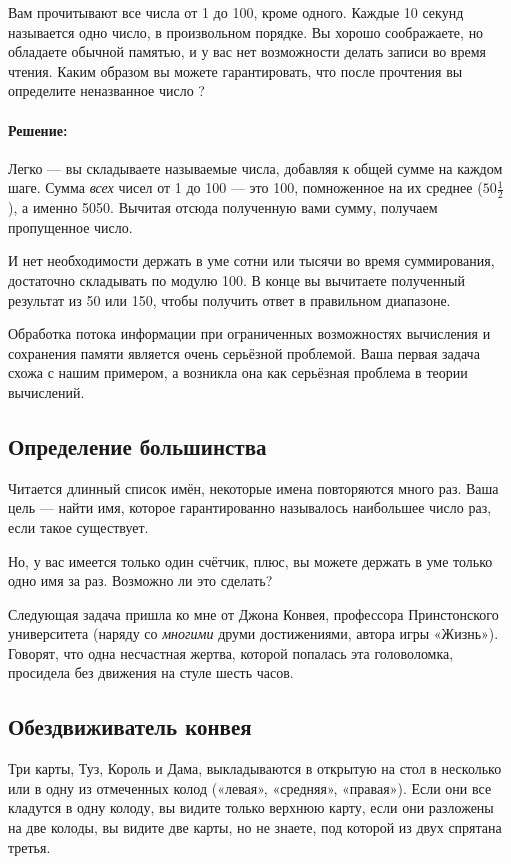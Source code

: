 Вам прочитывают все числа от 1 до 100, кроме одного.
Каждые 10 секунд называется одно число, в произвольном порядке.
Вы хорошо соображаете, но обладаете обычной памятью, и у вас нет возможности делать записи во время чтения.
Каким образом вы можете гарантировать, что после прочтения вы определите неназванное число ?

\paragraph{Решение:} Легко --- вы складываете называемые числа, добавляя к общей сумме на каждом шаге.
Сумма \emph{всех} чисел от 1 до 100 --- это 100, помноженное на их среднее ($50\tfrac12$), а именно 5050.
Вычитая отсюда полученную вами сумму, получаем пропущенное число.

И нет необходимости держать в уме сотни или тысячи во время суммирования, достаточно складывать по модулю 100.
В конце вы вычитаете полученный результат из 50 или 150, чтобы получить ответ в правильном диапазоне.
\heart

Обработка потока информации при ограниченных возможностях вычисления и сохранения памяти является очень серьёзной проблемой.
Ваша первая задача схожа с нашим примером, а возникла она как серьёзная проблема в теории вычислений.

\subsection*{Определение большинства}%

Читается длинный список имён, некоторые имена повторяются много раз.
Ваша цель --- найти имя, которое гарантированно называлось наибольшее число раз, если такое существует.

Но, у вас имеется только один счётчик, плюс, вы можете держать в уме только одно имя за раз.
Возможно ли это сделать?

Следующая задача пришла ко мне от Джона Конвея, профессора Принстонского университета (наряду со \emph{многими} друми достижениями, автора игры «Жизнь»).
Говорят, что одна несчастная жертва, которой попалась эта головоломка, просидела без движения на стуле шесть часов.

\subsection*{Обездвиживатель конвея}%

Три карты, Туз, Король и Дама, выкладываются в открытую на стол в несколько или в одну из отмеченных колод («левая», «средняя», «правая»).
Если они все кладутся в одну колоду, вы видите только верхнюю карту, если они разложены на две колоды, вы видите две карты, но не знаете, под которой из двух спрятана третья.

